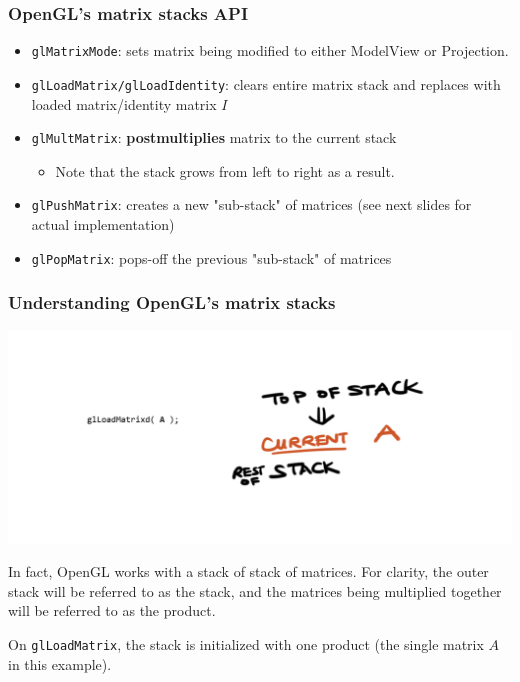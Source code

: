 \documentclass{beamer}
\begin{document}
\begin{frame}
    \frametitle{OpenGL's matrix stacks API}

    \label{matrixAPI}

    \begin{itemize}
        \item \texttt{glMatrixMode}: sets matrix being modified to either ModelView or Projection.
        \item \texttt{glLoadMatrix/glLoadIdentity}: clears entire matrix stack and replaces with loaded matrix/identity matrix $I$
        \item \texttt{glMultMatrix}: \textbf{postmultiplies} matrix to the current stack
        \begin{itemize}
            \item Note that the stack grows from left to right as a result.
        \end{itemize}
        \item \texttt{glPushMatrix}: creates a new "sub-stack" of matrices (see next slides for actual implementation)
        \item \texttt{glPopMatrix}: pops-off the previous "sub-stack" of matrices
    \end{itemize}

\end{frame}

\begin{frame}
    \frametitle{Understanding OpenGL's matrix stacks}

    \begin{center}
        \includegraphics[scale=0.4]{q8-1.png}
    \end{center}

    \small
    In fact, OpenGL works with a stack of stack of matrices.
    For clarity, the outer stack will be referred to as the stack, 
    and the matrices being multiplied together will be referred to as the product.

    On \texttt{glLoadMatrix}, the stack is initialized with one product (the single matrix $A$ in this example).

\end{frame}
\end{document}
